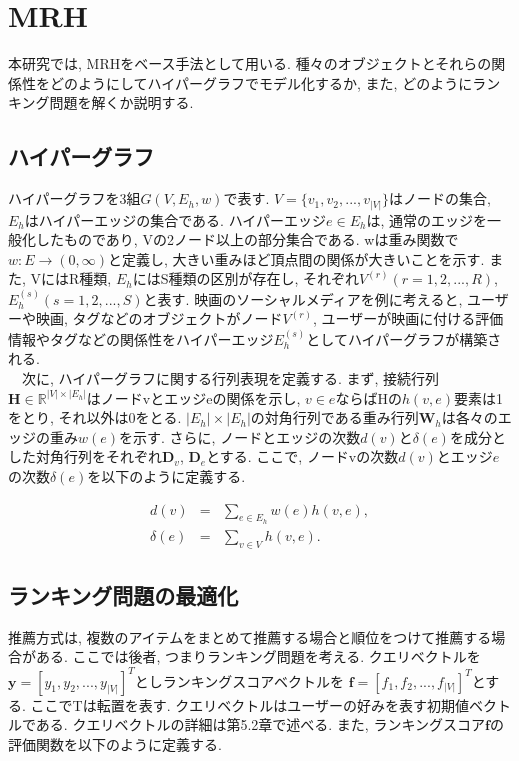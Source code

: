 \documentclass[a4j,11pt]{jarticle}           %
\begin{document}
	\section{MRH}
	本研究では, MRH\cite{MRH}をベース手法として用いる. 種々のオブジェクトとそれらの関係性をどのようにしてハイパーグラフでモデル化するか, 
	また, どのようにランキング問題を解くか説明する. 
	
	
	\subsection{ハイパーグラフ}
	ハイパーグラフを3組$G(V,E_h,w)$で表す. $V=\{v_1,v_2,...,v_{|V|}\}$はノードの集合,  $E_h$はハイパーエッジの集合である. ハイパーエッジ$e\in{E_h}$は, 通常のエッジを一般化したものであり, Vの2ノード以上の部分集合である. wは重み関数で$w:E\rightarrow (0,\infty)$と定義し, 大きい重みほど頂点間の関係が大きいことを示す. 
	また, VにはR種類, $E_h$にはS種類の区別が存在し, それぞれ$V^{(r)}(r=1,2,...,R)$, $E_h^{(s)}(s=1,2,...,S)$と表す. 映画のソーシャルメディアを例に考えると,  
	ユーザーや映画, タグなどのオブジェクトがノード$V^{(r)}$, ユーザーが映画に付ける評価情報やタグなどの関係性をハイパーエッジ$E_h^{(s)}$としてハイパーグラフが構築される. 
	\\　次に,  ハイパーグラフに関する行列表現を定義する. まず, 接続行列$\textbf{H}\in \mathbb{R}^{|V|\times |E_h|}$はノードvとエッジeの関係を示し, $v\in{e}$ならばHの$h(v, e)$要素は1をとり, それ以外は0をとる. $|E_h|\times |E_h|$の対角行列である重み行列$\textbf{W}_h$は各々のエッジの重み$w(e)$を示す. さらに, ノードとエッジの次数$d(v)$と$\delta(e)$を成分とした対角行列をそれぞれ$\textbf{D}_v$, $\textbf{D}_e$とする. ここで, ノードvの次数$d(v)$とエッジ$e$の次数$\delta(e)$を以下のように定義する. 
	
	\begin{eqnarray}
		d(v)&=&\sum_{e\in E_h}w(e)h(v,e), \\ \delta(e)&=&\sum_{v\in V}h(v,e). 
	\end{eqnarray}
	
	
	
	
	\subsection{ランキング問題の最適化}
	推薦方式は, 複数のアイテムをまとめて推薦する場合と順位をつけて推薦する場合がある. ここでは後者, つまりランキング問題を考える. クエリベクトルを$\textbf{y}=[y_1,y_2,...,y_{|V|}]^T$としランキングスコアベクトルを
	$\textbf{f}=[f_1,f_2,...,f_{|V|}]^T$とする. ここでTは転置を表す. クエリベクトルはユーザーの好みを表す初期値ベクトルである. 
	クエリベクトルの詳細は第5.2章で述べる. また, ランキングスコア$\textbf{f}$の評価関数を以下のように定義する. 
	
\end{document}

